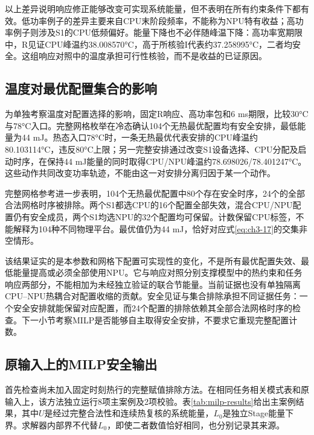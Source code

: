 以上差异说明响应修正能够改变可实现系统能量，但不表明在所有约束条件下都有效。低功率例子的差异主要来自CPU末阶段频率，不能称为NPU特有收益；高功率例子则涉及S1的CPU低频偏好。能量下降也不必伴随峰温下降：高功率宽期限中，R见证CPU峰温约38.008570°C，高于所核验I代表约37.258995°C，二者均安全。这组响应对照中的温度承担可行性核验，而不是收益的已证原因。

\subsection{温度对最优配置集合的影响}


为单独考察温度对配置选择的影响，固定R响应、高功率包和6 ms期限，比较30°C与78°C入口。完整网格枚举在冷态确认104个无热最优配置均有安全安排，最低能量为44 mJ。热态入口78°C时，一条无热最优代表安排的CPU峰温约80.103114°C，违反80°C上限；另一完整安排通过改变S1设备选择、CPU分配及启动时序，在保持44 mJ能量的同时取得CPU/NPU峰温约78.698026/78.401247°C。这些动作共同改变功率轨迹，不能由这一对安排分离归因于某一个动作。

完整网格参考进一步表明，104个无热最优配置中80个存在安全时序，24个的全部合法网格时序被排除。两个S1都选CPU的16个配置全部失效，混合CPU/NPU配置仍有安全成员，两个S1均选NPU的32个配置均可保留。计数保留CPU标签，不能解释为104种不同物理平台。最优值仍为44 mJ，恰好对应式\eqref{eq:ch3-17}的交集非空情形。

该结果证实的是本参数和网格下配置可实现性的变化，不是所有最优配置失效、最低能量提高或必须全部使用NPU。它与响应对照分别支撑模型中的热约束和任务响应两部分，不能相加为未经独立验证的联合节能量。当前证据也没有单独隔离CPU--NPU热耦合对配置收缩的贡献。安全见证与集合排除承担不同证据任务：一个安全安排就能保留对应配置，而24个配置的排除依赖其全部合法网格时序的检查。下一小节考察MILP是否能够自主取得安全安排，不要求它重现完整配置计数。


\subsection{原输入上的MILP安全输出}

首先检查尚未加入固定时刻热行的完整赋值排除方法。在相同任务相关模式表和原输入上，该方法独立运行8项主案例及2项校验。表\ref{tab:milp-results}给出主案例结果，其中$U$是经过完整合法性和连续热复核的系统能量，$L_0$是独立Stage能量下界。求解器内部界不代替$L_0$，即使二者数值恰好相同，也分别记录其来源。

